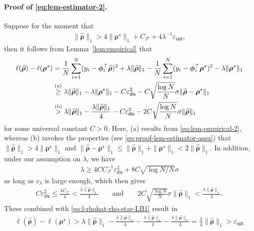 \documentclass[english]{article}
\begin{document}
\paragraph{Proof of \eqref{eq:lem-estimator-2}.}
%
Suppose for the moment that 
\begin{align}\label{eq:proof-lem-estimator-assu}
\|\widehat{{\bm \rho}}\|_1> 4\|{\bm \rho}^{\star}\|_1 +  C_{\mathcal{F}} + 4\lambda^{-1}\varepsilon_{\mathsf{opt}},
\end{align}
%
then it follows from Lemma~\ref{lem:empirical} that
%
\begin{align}
\ell(\widehat{{\bm \rho}}) - \ell({\bm \rho}^{\star}) &= \frac{1}{N}\sum_{i = 1}^N (y_i - {\bm \phi}_i^{\top}\widehat{{\bm \rho}})^2 + \lambda \|\widehat{{\bm \rho}}\|_1
- \frac{1}{N}\sum_{i = 1}^N (y_i - {\bm \phi}_i^{\top}{\bm \rho}^{\star})^2 - \lambda \|{\bm \rho}^{\star}\|_1 \notag \\
&\overset{\text{(a)}}{\ge} \lambda \|\widehat{{\bm \rho}}\|_1 - \lambda \|{\bm \rho}^{\star}\|_1 - 
C\varepsilon_{\mathsf{dis}}^2 - C\sqrt{\frac{\log N}{N}}\sigma \|\widehat{\bm \rho}-{\bm \rho}^{\star}\|_1 \notag\\
&\overset{\text{(b)}}{>} \lambda \|\widehat{\bm \rho}\|_1 - \frac{\lambda\|\widehat{\bm \rho}\|_1}{4} - 
C\varepsilon_{\mathsf{dis}}^2 - 2C\sqrt{\frac{\log N}{N}}\sigma \|\widehat{\bm \rho}\|_1
\label{eq:l-rhohat-rho-star-LB1}
\end{align}
%
for some universal constant $C>0$. Here, (a) results from \eqref{eq:lem-empirical-2}, whereas (b) invokes the properties (see \eqref{eq:proof-lem-estimator-assu}) that $\|\widehat{\bm \rho}\|_1 > 4\|{\bm \rho}^{\star}\|_1$ and $\|\widehat{\bm \rho} - {\bm \rho}^{\star}\|_1 \le \|\widehat{\bm \rho}\|_1 + \|{\bm \rho}^{\star}\|_1 < 2\|\widehat{\bm \rho}\|_1$.
In addition, under our assumption on $\lambda$, 
we have 
%
\begin{align}
\label{eq:lambda-LB-1357}
\lambda \ge 4C C_{\mathcal{F}}^{-1}\varepsilon_{\mathsf{dis}}^2 + 8C\sqrt{\log N/N}\sigma
\end{align}
%
as long as $c_{\lambda}$ is large enough, which then gives
%
\begin{align*}
C\varepsilon_{\mathsf{dis}}^2\le \frac{\lambda C_{\mathcal{F}}}{4} <  \frac{\lambda \|\widehat{\bm \rho}\|_1}{4}\qquad \text{and}\qquad 
2C\sqrt{\frac{\log N}{N}}\sigma \|\widehat{\bm \rho}\|_1 < \frac{\lambda \|\widehat{\bm \rho}\|_1}{4}.
\end{align*}
%
These combined with \eqref{eq:l-rhohat-rho-star-LB1} result in
%
\begin{align*}
\ell(\widehat{\bm \rho}) - \ell({\bm \rho}^{\star})
>\lambda \|\widehat{\bm \rho}\|_1 - \frac{\lambda\|\widehat{\bm \rho}\|_1}{4} - 
\frac{\lambda\|\widehat{\bm \rho}\|_1}{4} - \frac{\lambda\|\widehat{\bm \rho}\|_1}{4}
=
\frac{\lambda}{4} \|\widehat{\bm \rho}\|_1 > \varepsilon_{\mathsf{opt}}
\end{align*}
\end{document}
